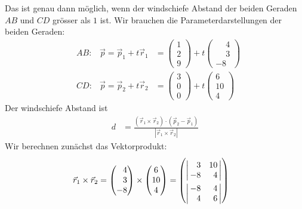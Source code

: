\begin{loesung}
Das ist genau dann möglich, wenn der windschiefe Abstand der beiden
Geraden $AB$ und $CD$ grösser als $1$ ist.
Wir brauchen die Parameterdarstellungen der beiden Geraden:
\[
\begin{aligned}
&AB:&\vec{p}=\vec{p}_1+t\vec{r}_1
&=
\begin{pmatrix}1\\2\\9\end{pmatrix} + t\begin{pmatrix}\phantom{-}4\\\phantom{-}3\\-8\end{pmatrix}
\\
&CD:&\vec{p}=\vec{p}_2+t\vec{r}_2
&=
\begin{pmatrix}3\\0\\0\end{pmatrix} + t\begin{pmatrix}6\\10\\4\end{pmatrix}
\end{aligned}
\]
Der windschiefe Abstand ist
\begin{align*}
d
&=
\frac{(\vec{r}_1\times\vec{r}_2)\cdot (\vec{p}_2 - \vec{p}_1)}{|\vec{r}_1\times \vec{r}_2|}
\end{align*}
Wir berechnen zunächst das Vektorprodukt:
\begin{align*}
\vec{r}_1\times \vec{r}_2
&=
\begin{pmatrix}\phantom{-}4\\\phantom{-}3\\-8\end{pmatrix}
\times
\begin{pmatrix}6\\10\\4\end{pmatrix}
=
{\def\arraystretch{2.2}
\begin{pmatrix}
{\def\arraystretch{1.0}
\left|\,\begin{matrix}\phantom{-}3&          10\\         - 8&\phantom{1}4\end{matrix}\,\right|}\\
{\def\arraystretch{1.0}
\left|\,\begin{matrix}         - 8&\phantom{1}4\\\phantom{-}4&\phantom{1}6\end{matrix}\,\right|}\\

\end{pmatrix}}
\end{align*}
\end{loesung}
